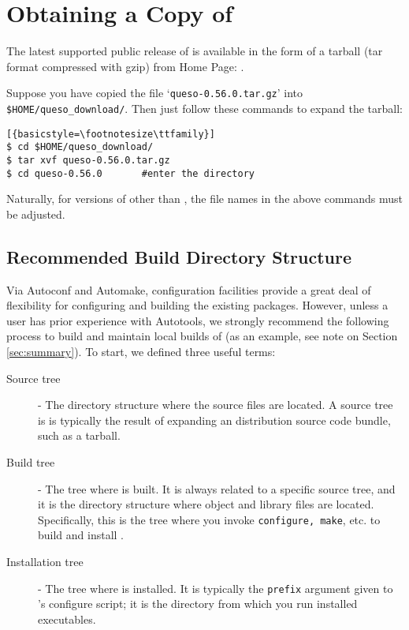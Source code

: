 \section{Obtaining a Copy of \Queso{}}

The latest supported public release of \Queso{} is available in the form of a tarball (tar format compressed with gzip) from \Queso{} Home Page: \Quesoweb.

Suppose you have copied the file `\verb+queso-0.56.0.tar.gz+' into \texttt{\$HOME/queso\_download/}.
Then just follow these commands to expand the tarball:
\begin{lstlisting}[{basicstyle=\footnotesize\ttfamily}]
$ cd $HOME/queso_download/
$ tar xvf queso-0.56.0.tar.gz
$ cd queso-0.56.0   	#enter the directory 
\end{lstlisting}

Naturally, for versions of \Queso{} other than \QUESOversion, the file names in the above commands must be adjusted.


\subsection{Recommended Build Directory Structure}\label{sec:Queso_tree}

Via Autoconf and Automake, \Queso{} configuration facilities provide a great deal 
of flexibility for configuring and building the existing \Queso{} packages. However,
unless a user has prior experience with Autotools, we strongly recommend
the following process to build and maintain local builds of \Queso{} (as an example, see note on Section \ref{sec:summary}).
To start, we defined three useful terms:

\begin{description}
 \item [Source tree] - The directory structure where the \Queso{} source files are located. A source
tree is is typically the result of expanding an \Queso{} distribution source code bundle, such as a tarball.%
 \item [Build tree] %
- The tree where \Queso{} is built. It is always related to a specific source tree, and it is the directory structure where object and library files are located. Specifically, this is the tree where you invoke \texttt{configure, make}, etc. to build and install \Queso{}. 
 \item [Installation tree] - The tree where \Queso{} is installed. It is typically the \texttt{prefix} argument given to \Queso{}'s configure script; it is the directory from which you run installed \Queso{} executables.
\end{description}

